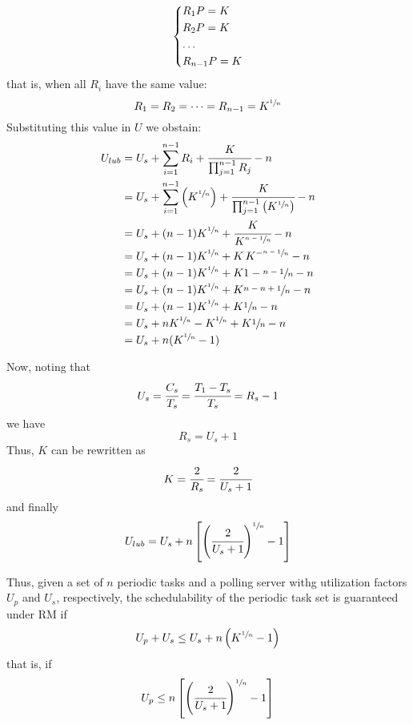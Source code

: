 \[
\begin{dcases}
    R_1P = K\\
    R_2P = K\\
    \dots\\
    R_{n-1}P = K
\end{dcases}
\]
that is, when all $R_i$ have the same value:
\[R_1 = R_2 = \dots = R_{n-1} = K^{\sfrac{1}{n}}\]
Substituting this value in $U$ we obstain:
\begin{align*}
    U_{lub} &= U_s + \sum_{i=1}^{n-1}R_i + \cfrac{K}{\prod_{j=1}^{n-1}R_j} - n\\
    &= U_s +\sum_{i=1}^{n-1}\left(K^{\sfrac{1}{n}}\right) + \cfrac{K}{\prod_{j=1}^{n-1}\left(K^{\sfrac{1}{n}}\right)} - n\\
    &= U_s + (n-1)K^{\sfrac{1}{n}} + \cfrac{K}{K^{\sfrac{n-1}{n}}}-n\\
    &= U_s + (n-1)K^{\sfrac{1}{n}} + K\,K^{-\sfrac{n-1}{n}}-n\\
    &= U_s + (n-1)K^{\sfrac{1}{n}} + K{1-\sfrac{n-1}{n}}-n\\
    &= U_s + (n-1)K^{\sfrac{1}{n}} + K{\sfrac{n-n+1}{n}}-n\\
    &= U_s + (n-1)K^{\sfrac{1}{n}} + K{\sfrac{1}{n}}-n\\
    &= U_s + nK^{\sfrac{1}{n}} - K^{\sfrac{1}{n}} + K{\sfrac{1}{n}} - n\\
    &= U_s + n(K^{\sfrac{1}{n}} - 1)
\end{align*}

Now, noting that 
\[U_s = \cfrac{C_s}{T_s} = \cfrac{T_1-T_s}{T_s} = R_s - 1\]
we have
\[R_s = U_s + 1\]
Thus, $K$ can be rewritten as
\[K = \cfrac{2}{R_s} = \cfrac{2}{U_s + 1}\]
and finally
\[U_{lub} = U_s + n \left[\left(\cfrac{2}{U_s + 1}\right)^{\sfrac{1}{n}}-1\right]\]

Thus, given a set of $n$ periodic tasks and a polling server withg utilization factors $U_p$ and $U_s$, respectively, the schedulability of the periodic task set is guaranteed under RM if
\[U_p + U_s \le U_s + n\left(K^{\sfrac{1}{n}} - 1\right)\]
that is, if
\[U_p \le n \left[\left(\cfrac{2}{U_s + 1}\right)^{\sfrac{1}{n}}-1\right]\]